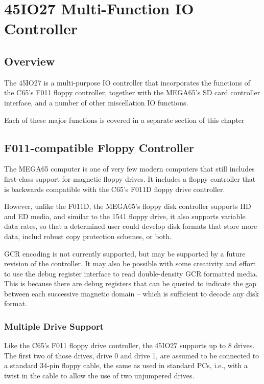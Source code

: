 \chapter{45IO27 Multi-Function IO Controller}

\section{Overview}

The 45IO27 is a multi-purpose IO controller that incorporates the functions of the
C65's F011 floppy controller, together with the MEGA65's SD card controller interface,
and a number of other miscellation IO functions.

Each of these major functions is covered in a separate section of this chapter

\section{F011-compatible Floppy Controller}

The MEGA65 computer is one of very few modern computers that still
includes first-class support for magnetic floppy drives.  It includes
a floppy controller that is backwards compatible with the C65's F011D
floppy drive controller.

However, unlike the F011D, the MEGA65's
floppy disk controller supports HD and ED media, and similar to the
1541 floppy drive, it also supports variable data rates, so that a
determined user could develop disk formats that store more data,
includ robust copy protection schemes, or both.

GCR encoding is not currently supported, but may be supported by a
future revision of the controller.  It may also be possible with some
creativity and effort to use the debug register interface to read
double-density GCR formatted media.  This is because there are debug
registers that can be queried to indicate the gap between each
successive magnetic domain -- which is sufficient to decode any disk
format. 

\subsection{Multiple Drive Support}

Like the C65's F011 floppy drive controller, the 45IO27 supports up to 8 drives.
The first two of those drives, drive 0 and drive 1, are assumed to be connected to a
standard 34-pin floppy cable, the same as used in standard PCs, i.e.,
with a twist in the cable to allow the use of two unjumpered drives.

